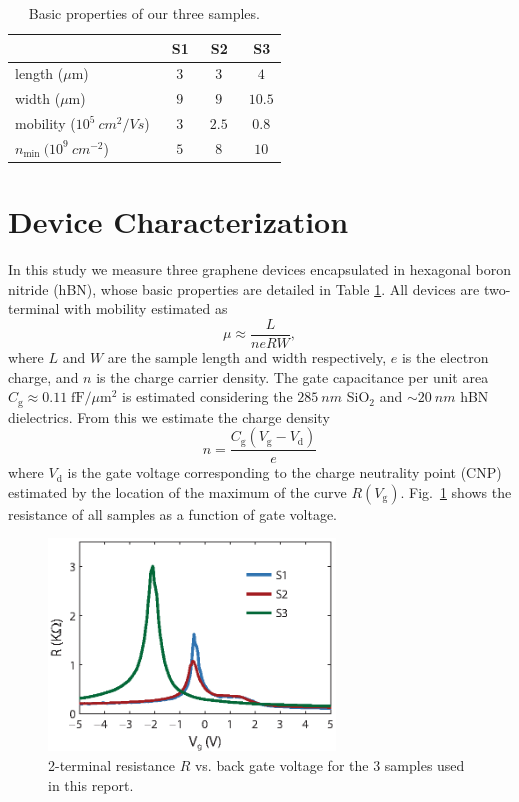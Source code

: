 \begin{table}
\centering
\begin{tabular}{| l | c | c | c |}\hline
&\  S1 &\ S2 &\ S3 \\\hline
length ($\mu$m) &\ $3$ &\ $3$ &\ $4$ \\
width ($\mu$m) &\ $9$ &\ $9$ &\ $10.5$ \\
mobility ($10^5~cm^2/Vs$) &\ $3$ &\ $2.5$ &\ $0.8$ \\
$n_{\mathrm{min}}~(10^9~cm^{-2}$) &\ $5$ &\ $8$ &\ $10$ \\\hline
\end{tabular}
\caption{Basic properties of our three samples.}
\label{table:DF_table1}
\end{table}

\section{Device Characterization}\label{section:DF_devicechar}
In this study we measure three graphene devices encapsulated in hexagonal boron nitride (hBN), whose basic properties are detailed in Table \ref{table:DF_table1}. All devices are two-terminal with mobility estimated as \begin{equation}
\mu\approx \frac{L}{neRW},
\end{equation}
where $L$ and $W$ are the sample length and width respectively, $e$ is the electron charge, and $n$ is the charge carrier density. The gate capacitance per unit area $C_{\mathrm{g}}\approx 0.11\; \mathrm{fF}/\mu \mathrm{m}^2$ is estimated considering the $285~nm$ SiO$_2$ and ${\sim 20}~nm$ hBN dielectrics.   From this we estimate the charge density \begin{equation}
n=\frac{C_{\mathrm{g}}(V_{\mathrm{g}}-V_{\mathrm{d}})}{e}
\end{equation} where $V_{\mathrm{d}}$ is the gate voltage corresponding to the charge neutrality point (CNP) estimated by the location of the maximum of the curve $R(V_{\mathrm{g}})$.   Fig.~\ref{fig:DF_S1} shows the resistance of all samples as a function of gate voltage.

\begin{figure}
\centering
\includegraphics[width=3in]{figures/Dirac_fluid/S1.eps}
\caption{2-terminal resistance $R$ vs. back gate voltage for the 3 samples used in this report.}
\label{fig:DF_S1}
\end{figure}

